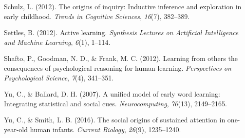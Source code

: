\documentclass[a4paper,man,apacite,floatsintext]{apa6}
\begin{document}
\hypertarget{ref-schulz2012origins}{}
Schulz, L. (2012). The origins of inquiry: Inductive inference and
exploration in early childhood. \emph{Trends in Cognitive Sciences},
\emph{16}(7), 382--389.

\hypertarget{ref-settles2012active}{}
Settles, B. (2012). Active learning. \emph{Synthesis Lectures on
Artificial Intelligence and Machine Learning}, \emph{6}(1), 1--114.

\hypertarget{ref-shafto2012learning}{}
Shafto, P., Goodman, N. D., \& Frank, M. C. (2012). Learning from others
the consequences of psychological reasoning for human learning.
\emph{Perspectives on Psychological Science}, \emph{7}(4), 341--351.

\hypertarget{ref-yu2007unified}{}
Yu, C., \& Ballard, D. H. (2007). A unified model of early word
learning: Integrating statistical and social cues.
\emph{Neurocomputing}, \emph{70}(13), 2149--2165.

\hypertarget{ref-yu2016social}{}
Yu, C., \& Smith, L. B. (2016). The social origins of sustained
attention in one-year-old human infants. \emph{Current Biology},
\emph{26}(9), 1235--1240.


\end{document}
